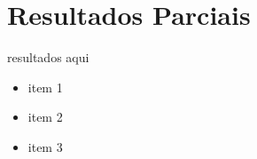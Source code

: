 \pagestyle{fancy}

\chapter{Resultados Parciais}\label{cap5}

resultados aqui

\begin{itemize}

\item item 1
\item item 2
\item item 3

\end{itemize}
